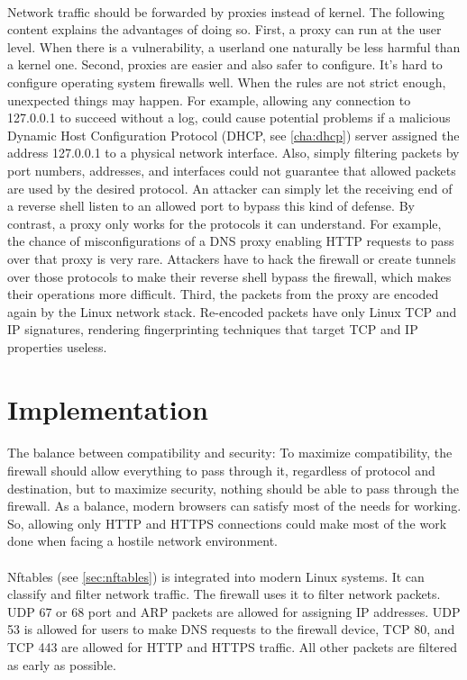 \documentclass[mscthesis]{usiinfthesis}
\begin{document}
\paragraph{}
Network traffic should be forwarded by proxies instead of kernel. The following content explains the advantages of doing so. First, a proxy can run at the user level. When there is a vulnerability, a userland one naturally be less harmful than a kernel one. Second, proxies are easier and also safer to configure. It's hard to configure operating system firewalls well. When the rules are not strict enough, unexpected things may happen. For example, allowing any connection to 127.0.0.1 to succeed without a log, could cause potential problems if a malicious Dynamic Host Configuration Protocol (DHCP, see \cref{cha:dhcp}) server assigned the address 127.0.0.1 to a physical network interface. Also, simply filtering packets by port numbers, addresses, and interfaces could not guarantee that allowed packets are used by the desired protocol. An attacker can simply let the receiving end of a reverse shell listen to an allowed port to bypass this kind of defense. By contrast, a proxy only works for the protocols it can understand. For example, the chance of misconfigurations of a DNS proxy enabling HTTP requests to pass over that proxy is very rare. Attackers have to hack the firewall or create tunnels over those protocols to make their reverse shell bypass the firewall, which makes their operations more difficult. Third, the packets from the proxy are encoded again by the Linux network stack. Re-encoded packets have only Linux TCP and IP signatures, rendering fingerprinting techniques that target TCP and IP properties useless.

\section{Implementation}
\paragraph{}
The balance between compatibility and security: To maximize compatibility, the firewall should allow everything to pass through it, regardless of protocol and destination, but to maximize security, nothing should be able to pass through the firewall. As a balance, modern browsers can satisfy most of the needs for working. So, allowing only HTTP and HTTPS connections could make most of the work done when facing a hostile network environment.
\paragraph{}
Nftables (see \cref{sec:nftables}) is integrated into modern Linux systems. It can classify and filter network traffic. The firewall uses it to filter network packets. UDP 67 or 68 port and ARP packets are allowed for assigning IP addresses. UDP 53 is allowed for users to make DNS requests to the firewall device, TCP 80, and TCP 443 are allowed for HTTP and HTTPS traffic. All other packets are filtered as early as possible.
\end{document}
